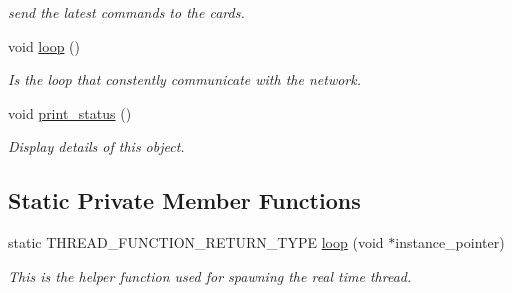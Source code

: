 \begin{DoxyCompactItemize}
\begin{DoxyCompactList}\small\item\em send the latest commands to the cards. \end{DoxyCompactList}\item 
void \hyperlink{classblmc__drivers_1_1CanBusMotorBoard_a542f8df35ff34348976ed1d55797a15a}{loop} ()\hypertarget{classblmc__drivers_1_1CanBusMotorBoard_a542f8df35ff34348976ed1d55797a15a}{}\label{classblmc__drivers_1_1CanBusMotorBoard_a542f8df35ff34348976ed1d55797a15a}

\begin{DoxyCompactList}\small\item\em Is the loop that constently communicate with the network. \end{DoxyCompactList}\item 
void \hyperlink{classblmc__drivers_1_1CanBusMotorBoard_a43b773d56156d4855e6b3b7b7b00b350}{print\+\_\+status} ()\hypertarget{classblmc__drivers_1_1CanBusMotorBoard_a43b773d56156d4855e6b3b7b7b00b350}{}\label{classblmc__drivers_1_1CanBusMotorBoard_a43b773d56156d4855e6b3b7b7b00b350}

\begin{DoxyCompactList}\small\item\em Display details of this object. \end{DoxyCompactList}\end{DoxyCompactItemize}
\subsection*{Static Private Member Functions}
\begin{DoxyCompactItemize}
\item 
static T\+H\+R\+E\+A\+D\+\_\+\+F\+U\+N\+C\+T\+I\+O\+N\+\_\+\+R\+E\+T\+U\+R\+N\+\_\+\+T\+Y\+PE \hyperlink{classblmc__drivers_1_1CanBusMotorBoard_af6d242ea933e9ad23c37167ba848f017}{loop} (void $\ast$instance\+\_\+pointer)
\begin{DoxyCompactList}\small\item\em This is the helper function used for spawning the real time thread. \end{DoxyCompactList}\end{DoxyCompactItemize}

